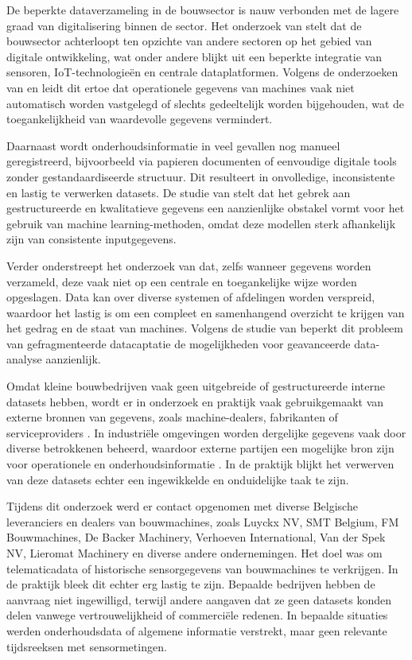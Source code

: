 De beperkte dataverzameling in de bouwsector is nauw verbonden met de lagere graad van digitalisering binnen de sector. Het onderzoek van \textcite{Mikulic2024} stelt dat de bouwsector achterloopt ten opzichte van andere sectoren op het gebied van digitale ontwikkeling, wat onder andere blijkt uit een beperkte integratie van sensoren, IoT-technologieën en centrale dataplatformen. Volgens de onderzoeken van \textcite{Mikulic2024} en \textcite{Hu2024} leidt dit ertoe dat operationele gegevens van machines vaak niet automatisch worden vastgelegd of slechts gedeeltelijk worden bijgehouden, wat de toegankelijkheid van waardevolle gegevens vermindert.

Daarnaast wordt onderhoudsinformatie in veel gevallen nog manueel geregistreerd, bijvoorbeeld via papieren documenten of eenvoudige digitale tools zonder gestandaardiseerde structuur. Dit resulteert in onvolledige, inconsistente en lastig te verwerken datasets. De studie van \textcite{Hu2024} stelt dat het gebrek aan gestructureerde en kwalitatieve gegevens een aanzienlijke obstakel vormt voor het gebruik van machine learning-methoden, omdat deze modellen sterk afhankelijk zijn van consistente inputgegevens.

Verder onderstreept het onderzoek van \textcite{Wang2025} dat, zelfs wanneer gegevens worden verzameld, deze vaak niet op een centrale en toegankelijke wijze worden opgeslagen. Data kan over diverse systemen of afdelingen worden verspreid, waardoor het lastig is om een compleet en samenhangend overzicht te krijgen van het gedrag en de staat van machines. Volgens de studie van \textcite{Wang2025} beperkt dit probleem van gefragmenteerde datacaptatie de mogelijkheden voor geavanceerde data-analyse aanzienlijk.

Omdat kleine bouwbedrijven vaak geen uitgebreide of gestructureerde interne datasets hebben, wordt er in onderzoek en praktijk vaak gebruikgemaakt van externe bronnen van gegevens, zoals machine-dealers, fabrikanten of serviceproviders \autocite{Elahi2023, Hu2024}. In industriële omgevingen worden dergelijke gegevens vaak door diverse betrokkenen beheerd, waardoor externe partijen een mogelijke bron zijn voor operationele en onderhoudsinformatie \autocite{Meddaoui2024, Nayak2024}. In de praktijk blijkt het verwerven van deze datasets echter een ingewikkelde en onduidelijke taak te zijn.

Tijdens dit onderzoek werd er contact opgenomen met diverse Belgische leveranciers en dealers van bouwmachines, zoals Luyckx NV, SMT Belgium, FM Bouwmachines, De Backer Machinery, Verhoeven International, Van der Spek NV, Lieromat Machinery en diverse andere ondernemingen. Het doel was om telematicadata of historische sensorgegevens van bouwmachines te verkrijgen. In de praktijk bleek dit echter erg lastig te zijn. Bepaalde bedrijven hebben de aanvraag niet ingewilligd, terwijl andere aangaven dat ze geen datasets konden delen vanwege vertrouwelijkheid of commerciële redenen. In bepaalde situaties werden onderhoudsdata of algemene informatie verstrekt, maar geen relevante tijdsreeksen met sensormetingen.

